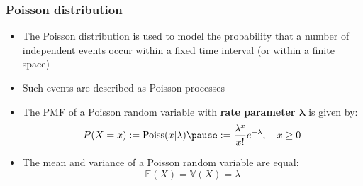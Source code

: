 \documentclass[usenames,dvipsnames,smaller%
]{beamer}
\newcommand{\?}{\stackrel{?}{=}}
\newcommand{\fr}{\frac}
\newcommand{\rd}{\color{red}}
\newcommand{\la}{\lambda}
\begin{document}
\begin{frame}
  \frametitle{Poisson distribution} \pause
  \begin{itemize}[<+->]
  \item The Poisson distribution is used to model the probability that a number of independent events occur within a fixed time interval (or within a finite space)

  \item Such events are described as Poisson processes

  \item The PMF of a Poisson random variable with {\bf \rd rate parameter $\bm\la$} is given by:\pause
    \begin{equation}
      P(X=x) := \mathrm{Poiss}(x|\la) \pause := \fr{\la^{x}}{x!} e^{-\la}, \quad x \ge 0
    \end{equation}
    \pause

  \item The mean and variance of a Poisson random variable are equal:
    \begin{equation}
      \mathbb{E}(X) = \mathbb{V}(X) = \la
    \end{equation}


  \end{itemize}

  \pause

    \begin{center}
\end{center}
\end{frame}
\end{document}
